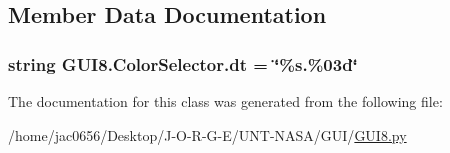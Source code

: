 \subsection{Member Data Documentation}
\subsubsection[{\texorpdfstring{dt}{dt}}]{\setlength{\rightskip}{0pt plus 5cm}string G\+U\+I8.\+Color\+Selector.\+dt = \char`\"{}\%s.\%03d\char`\"{}\hspace{0.3cm}{\ttfamily [static]}}\hypertarget{classGUI8_1_1ColorSelector_af1a5f907f08fe7e2078ac767df1addb4}{}\label{classGUI8_1_1ColorSelector_af1a5f907f08fe7e2078ac767df1addb4}


The documentation for this class was generated from the following file\+:\begin{DoxyCompactItemize}
\item 
/home/jac0656/\+Desktop/\+J-\/\+O-\/\+R-\/\+G-\/\+E/\+U\+N\+T-\/\+N\+A\+S\+A/\+G\+U\+I/\hyperlink{GUI_2GUI8_8py}{G\+U\+I8.\+py}\end{DoxyCompactItemize}
